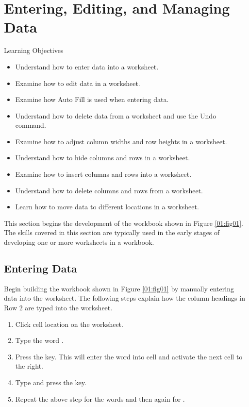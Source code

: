 \section{Entering, Editing, and Managing Data}

\begin{center}
	\begin{objbox}{Learning Objectives}
		\begin{itemize}
			\setlength{\itemsep}{0pt}
			\setlength{\parskip}{0pt}
			\setlength{\parsep}{0pt}
			
			\item Understand how to enter data into a worksheet.
			\item Examine how to edit data in a worksheet.
			\item Examine how Auto Fill is used when entering data.
			\item Understand how to delete data from a worksheet and use the Undo command.
			\item Examine how to adjust column widths and row heights in a worksheet.
			\item Understand how to hide columns and rows in a worksheet.
			\item Examine how to insert columns and rows into a worksheet.
			\item Understand how to delete columns and rows from a worksheet.
			\item Learn how to move data to different locations in a worksheet.

		\end{itemize}
	\end{objbox}
\end{center}

This section begins the development of the workbook shown in Figure \ref{01:fig01}. The skills covered in this section are typically used in the early stages of developing one or more worksheets in a workbook.

\subsection{Entering Data}

Begin building the workbook shown in Figure \ref{01:fig01} by manually entering data into the worksheet. The following steps explain how the column headings in Row 2 are typed into the worksheet.

\begin{enumerate}
	\item Click cell location  on the worksheet.
	\item Type the word .
	\item Press the  key. This will enter the word into cell  and activate the next cell to the right.
	\item Type  and press the  key.
	\item Repeat the above step for the words  and then again for .
\end{enumerate}

